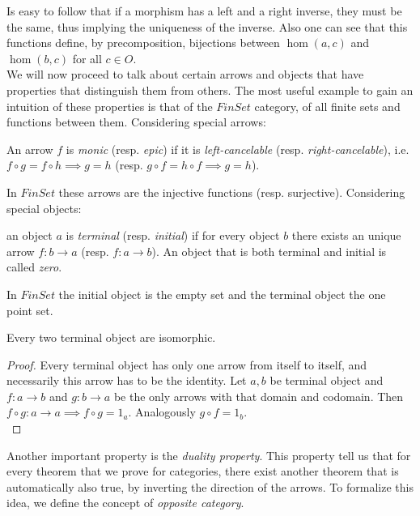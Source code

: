 Is easy to follow that if a morphism has a left and a right inverse, they must be the same, thus implying the uniqueness of the inverse. Also one can see that this functions define, by precomposition, bijections between $\hom(a,c)$ and $\hom(b,c)$ for all $c\in O$.\\

We will now proceed to talk about certain arrows and objects that have properties that distinguish them from others.  The most useful example to gain an intuition of these properties is that of the $FinSet$ category, of all finite sets and functions between them.  Considering special arrows:\\

\begin{definition} An arrow $f$ is  \emph{monic} (resp. \emph{epic}) if it is \emph{left-cancelable} (resp. \emph{right-cancelable}), i.e.  $f\circ g = f \circ h \implies g = h$ (resp. $g\circ f = h \circ f \implies g = h$).
\end{definition}



In $FinSet$ these arrows are the injective functions (resp. surjective). Considering special objects:

\begin{definition}
  an object $a$ is \emph{terminal} (resp. \emph{initial}) if for every object $b$ there exists an unique arrow $f:b\to a$ (resp. $f:a\to b$).  An object that is both terminal and initial is called \emph{zero}.
\end{definition}

In $FinSet$ the initial object is the  empty set and the terminal object the one point set.

\begin{proposition}\label{terminal-proposition}
  Every two terminal object are isomorphic.
\end{proposition}
\begin{proof}
  Every terminal object has only one arrow from itself to itself, and necessarily this arrow has to be the identity. Let $a, b$ be terminal object and $f:a\to b$ and $g:b\to a$ be the only arrows with that domain and codomain. Then $f\circ g : a \to a \implies f \circ g = 1_a$. Analogously $g \circ f = 1_b$.\\
\end{proof}

Another important property is the \emph{duality property}. This property tell us that for every theorem that we prove for categories, there exist another theorem that is automatically also true, by inverting the direction of the arrows. To formalize this idea, we define the concept of \emph{opposite category}.


